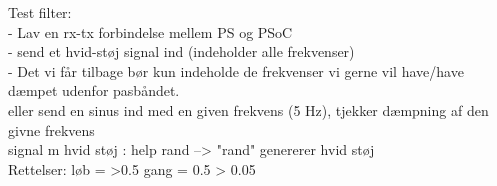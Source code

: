 Test filter:\\
- Lav en rx-tx forbindelse mellem PS og PSoC\\
- send et hvid-støj signal ind (indeholder alle frekvenser)\\
- Det vi får tilbage bør kun indeholde de frekvenser vi gerne vil have/have dæmpet udenfor pasbåndet. \\

eller send en sinus ind med en given frekvens (5 Hz), tjekker dæmpning af den givne frekvens\\

signal m hvid støj : help rand --> "rand" genererer hvid støj\\








Rettelser:
løb = >0.5
gang = 0.5 > 0.05

